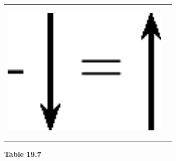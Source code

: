 \begin{center}
\begin{xtabular*}{\mytablewidth}[t]{|p{10\mystarwidth}|p{10\mystarwidth}|}
\label{m38813*id188922}
    \begin{center}
    \label{m38813*id188922!!!underscore!!!media}\label{m38813*id188922!!!underscore!!!printimage}\includegraphics[width=300px]{col11305.imgs/m38813_PG11C1_034.png} %
        
      \vspace{2pt}
    \vspace{.1in}
    
    \end{center}



    \addtocounter{footnote}{-0}
    
     \tabularnewline{}
    \end{xtabular*}
      \end{center}
    \begin{center}{\small\bfseries Table 19.7}\end{center}
    
    \addtocounter{footnote}{-0}
    
    \par
  
        
        
    
      

